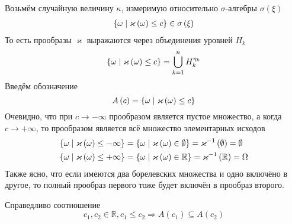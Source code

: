 Возьмём случайную величину $\kappa$, измеримую относительно $\sigma$-алгебры
$\sigma\left( \xi \right)$
\begin{align*}
  \left\{ \omega \;\middle|\; \varkappa\left( \omega \right) \le c \right\}
      \in \sigma\left( \xi \right)
\end{align*}
То есть прообразы $\varkappa$ выражаются через объединения уровней $H_k$
$$\left\{ \omega \;\middle|\; \varkappa\left( \omega \right) \le c \right\}
  = \bigcup_{k=1}^n H_k^{\eta_k}$$
Введём обозначение
$$A\left( c \right)
  = \left\{ \omega \;\middle|\; \varkappa\left( \omega \right) \le c \right\}$$
Очевидно, что при $c\to-\infty$ прообразом является пустое множество,
а когда $c\to+ \infty$, то прообразом является всё множество элементарных исходов
\begin{align*}
  \left\{ \omega \;\middle|\; \varkappa\left( \omega \right) \le -\infty \right\}
      &= \left\{ \omega \;\middle|\; \varkappa\left(\omega\right)\in\emptyset \right\}
      = \varkappa^{-1}\left( \emptyset \right)
      = \emptyset \\
  \left\{ \omega \;\middle|\; \varkappa\left( \omega \right) \le + \infty \right\}
      &= \left\{ \omega \;\middle|\;\varkappa\left(\omega\right)\in\mathbb{R} \right\}
      = \varkappa^{-1}\left( \mathbb{R} \right)
      = \Omega
\end{align*}
Также ясно, что если имеются два борелевских множества и одно
включёно в другое, то полный прообраз первого тоже будет включён в
прообраз второго.
\begin{comment}
\begin{align*}
  \Delta_1, \Delta_2 \in \mathfrak{B},
  \Delta_1 \subseteq \Delta_2 \\
  \Rightarrow \varkappa^{-1}\left( \Delta_1 \right)
      \subseteq \varkappa^{-1}\left( \Delta_1 \right)
      \cup \varkappa^{-1}\left( \Delta_2 \right) = \\
      = \varkappa^{-1}\left( \Delta_1 \cup \Delta_2 \right)
      = \varkappa^{-1}\left( \Delta_2 \right)
\end{align*}
\end{comment}
Справедливо соотношение
\begin{equation*}
  c_1, c_2 \in \mathbb{R}, c_1 \le c_2
  \Rightarrow A\left( c_1 \right) \subseteq A\left( c_2 \right)
\end{equation*}

